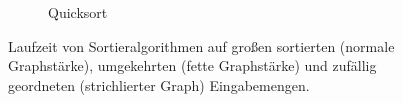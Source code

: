 \begin{figure}
\begin{subfigure}[b]{.5\linewidth}
    \end{subfigure}%
    \hfill
    \begin{subfigure}[b]{.5\linewidth}
        \caption{Quicksort}
    \end{subfigure}

    \caption{Laufzeit von Sortieralgorithmen auf großen sortierten (normale Graphstärke), umgekehrten (fette Graphstärke) und zufällig geordneten (strichlierter Graph) Eingabemengen.}
    \label{fig:app-linear-large}
\end{figure}

